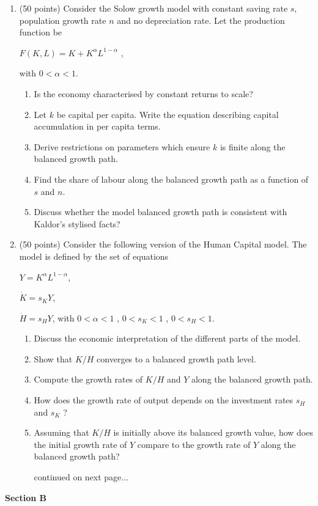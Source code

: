 \documentclass[a4paper,12pt]{article}
\begin{document}
\begin{enumerate}
%
%
\item (50 points) Consider the Solow growth model with constant saving
  rate $s$, population growth rate $n$ and no depreciation rate. Let the
  production function be

\begin{center}
$F(K,L)=K+K^{\alpha}L^{1-\alpha}$ ,

\end{center}
with $0<\alpha<1$.
\begin{enumerate}
	\item Is the economy characterised by constant returns to scale?
	\item Let $k$ be capital per capita. Write the equation describing capital accumulation in
   per capita terms.
   \item Derive restrictions on parameters which ensure $k$ is finite along the balanced
   growth path.
   \item Find the share of labour along the balanced growth path as a function of $s$ and $n$.
	 \item Discuss whether the model balanced growth path is consistent with Kaldor's
   stylised facts?
\end{enumerate}
%
\item (50 points) Consider the following version of the Human Capital
  model. The model is defined by the set of equations

$Y=K^{\alpha}L^{1-\alpha}$,

$\dot K=s_{K}Y$,

   $\dot H=s_{H}Y$,
with $ 0<\alpha <1$ , $0<s_{K}<1$ , $0<s_{H}<1$.
\begin{enumerate}
	\item Discuss the economic interpretation of the different parts of the model.
	\item Show that $K/H$ converges to a balanced growth path level.
	\item Compute the growth rates of $K/H$ and $Y$ along the balanced growth path.
  \item How does the growth rate of output depends on the investment rates $s_{H}$ and $s_{K}$ ?
  \item Assuming that $K/H$ is initially above its balanced growth value, how does the
   initial growth rate of $Y$ compare to the growth rate of $Y$ along the balanced growth
   path?
\vfill
\begin{flushright}
continued on next page...
\end{flushright}
\end{enumerate}
\end{enumerate}
\newpage
\textbf{Section B}
\end{document}
